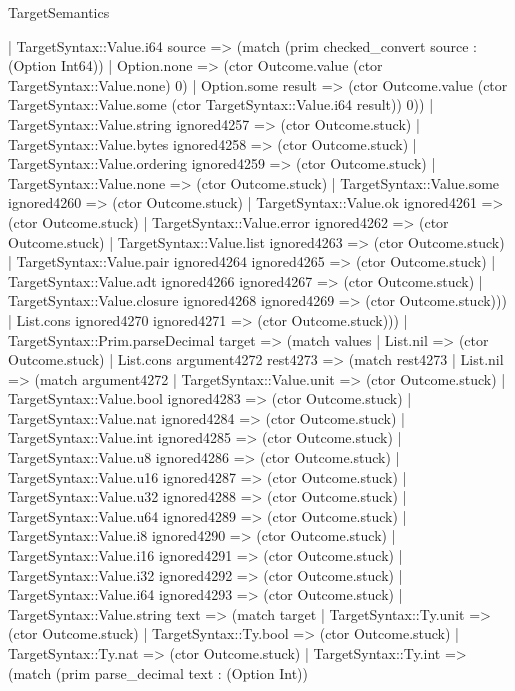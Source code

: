 \begin{lexlean}{TargetSemantics}
\begin{semanticmodule}
{            | TargetSyntax::Value.i64 source => (match (prim checked_convert source : (Option Int64))
              | Option.none => (ctor Outcome.value (ctor TargetSyntax::Value.none) 0)
              | Option.some result => (ctor Outcome.value (ctor TargetSyntax::Value.some (ctor TargetSyntax::Value.i64 result)) 0))
            | TargetSyntax::Value.string ignored4257 => (ctor Outcome.stuck)
            | TargetSyntax::Value.bytes ignored4258 => (ctor Outcome.stuck)
            | TargetSyntax::Value.ordering ignored4259 => (ctor Outcome.stuck)
            | TargetSyntax::Value.none => (ctor Outcome.stuck)
            | TargetSyntax::Value.some ignored4260 => (ctor Outcome.stuck)
            | TargetSyntax::Value.ok ignored4261 => (ctor Outcome.stuck)
            | TargetSyntax::Value.error ignored4262 => (ctor Outcome.stuck)
            | TargetSyntax::Value.list ignored4263 => (ctor Outcome.stuck)
            | TargetSyntax::Value.pair ignored4264 ignored4265 => (ctor Outcome.stuck)
            | TargetSyntax::Value.adt ignored4266 ignored4267 => (ctor Outcome.stuck)
            | TargetSyntax::Value.closure ignored4268 ignored4269 => (ctor Outcome.stuck)))
        | List.cons ignored4270 ignored4271 => (ctor Outcome.stuck)))
    | TargetSyntax::Prim.parseDecimal target => (match values
      | List.nil => (ctor Outcome.stuck)
      | List.cons argument4272 rest4273 => (match rest4273
        | List.nil => (match argument4272
          | TargetSyntax::Value.unit => (ctor Outcome.stuck)
          | TargetSyntax::Value.bool ignored4283 => (ctor Outcome.stuck)
          | TargetSyntax::Value.nat ignored4284 => (ctor Outcome.stuck)
          | TargetSyntax::Value.int ignored4285 => (ctor Outcome.stuck)
          | TargetSyntax::Value.u8 ignored4286 => (ctor Outcome.stuck)
          | TargetSyntax::Value.u16 ignored4287 => (ctor Outcome.stuck)
          | TargetSyntax::Value.u32 ignored4288 => (ctor Outcome.stuck)
          | TargetSyntax::Value.u64 ignored4289 => (ctor Outcome.stuck)
          | TargetSyntax::Value.i8 ignored4290 => (ctor Outcome.stuck)
          | TargetSyntax::Value.i16 ignored4291 => (ctor Outcome.stuck)
          | TargetSyntax::Value.i32 ignored4292 => (ctor Outcome.stuck)
          | TargetSyntax::Value.i64 ignored4293 => (ctor Outcome.stuck)
          | TargetSyntax::Value.string text => (match target
            | TargetSyntax::Ty.unit => (ctor Outcome.stuck)
            | TargetSyntax::Ty.bool => (ctor Outcome.stuck)
            | TargetSyntax::Ty.nat => (ctor Outcome.stuck)
            | TargetSyntax::Ty.int => (match (prim parse_decimal text : (Option Int))
}
\end{semanticmodule}
\end{lexlean}
